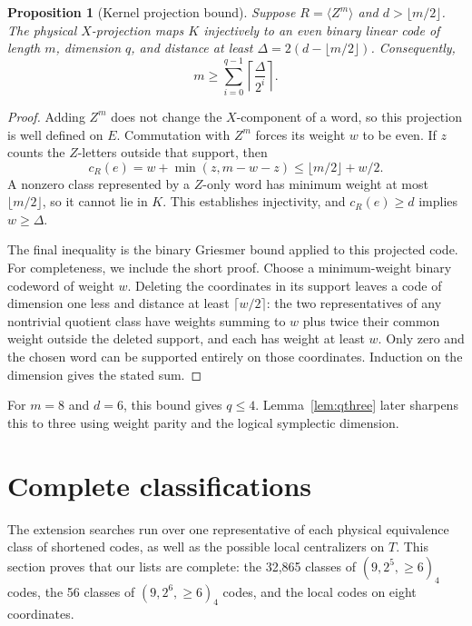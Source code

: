 \documentclass[11pt]{article}
\newtheorem{proposition}[theorem]{Proposition}
\theoremstyle{definition}
\theoremstyle{remark}
\newcommand{\cost}{c_R}
\begin{document}
\begin{proposition}[Kernel projection bound]\label{prop:griesmer}
Suppose \(R=\langle Z^m\rangle\) and \(d>\lfloor m/2\rfloor\).
The physical \(X\)-projection maps \(K\) injectively to an even binary
linear code of length \(m\), dimension \(q\), and distance at least
\(\Delta=2(d-\lfloor m/2\rfloor)\). Consequently,
\begin{equation}\label{eq:griesmer}
 m\geq\sum_{i=0}^{q-1}\left\lceil\frac{\Delta}{2^i}\right\rceil.
\end{equation}
\end{proposition}
\begin{proof}
Adding \(Z^m\) does not change the \(X\)-component of a word, so this
projection is well defined on \(E\). Commutation with \(Z^m\) forces its
weight \(w\) to be even. If \(z\) counts the \(Z\)-letters outside that
support, then
\[
 \cost(e)=w+\min(z,m-w-z)\leq\lfloor m/2\rfloor+w/2.
\]
A nonzero class represented by a \(Z\)-only word has minimum weight at
most \(\lfloor m/2\rfloor\), so it cannot lie in \(K\). This establishes
injectivity, and \(\cost(e)\geq d\) implies \(w\geq\Delta\).

The final inequality is the binary Griesmer bound applied to this
projected code. For completeness, we include the short proof. Choose a
minimum-weight binary codeword of weight \(w\). Deleting the coordinates
in its support leaves a code of dimension one less and distance at least
\(\lceil w/2\rceil\): the two representatives of any nontrivial quotient
class have weights summing to \(w\) plus twice their common weight
outside the deleted support, and each has weight at least \(w\). Only
zero and the chosen word can be supported entirely on those coordinates.
Induction on the dimension gives the stated sum.
\end{proof}

For \(m=8\) and \(d=6\), this bound gives \(q\leq4\).
Lemma~\ref{lem:qthree} later sharpens this to three using weight parity
and the logical symplectic dimension.

\section{Complete classifications}\label{sec:classification}

The extension searches run over one representative of each physical
equivalence class of shortened codes, as well as the possible local
centralizers on \(T\). This section proves that our lists are complete:
the 32,865 classes of \((9,2^5,\geq6)_4\) codes, the 56 classes of
\((9,2^6,\geq6)_4\) codes, and the local codes on eight coordinates.
\end{document}
